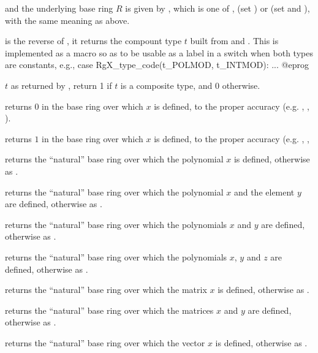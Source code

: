 and the underlying base ring $R$ is given by , which
is one of ,  (set ) or 
(set  and ), with the same meaning
as above.

 is the reverse of
, it returns the compount type $t$ built from
 and . This is implemented as a macro so as to be usable
as a label in a switch when both types are constants, e.g.,
\bprog
  case RgX_type_code(t_POLMOD, t_INTMOD): ...
@eprog

 $t$ as returned by ,
return 1 if $t$ is a composite type, and 0 otherwise.

 returns $0$ in the base ring over which $x$
is defined, to the proper accuracy (e.g. , ,
).

 returns $1$ in the base ring over which $x$
is defined, to the proper accuracy (e.g. , ,

 returns
the ``natural'' base ring over which the polynomial $x$ is defined,
otherwise as .

returns the ``natural'' base ring over which the polynomial $x$ and the element
$y$ are defined, otherwise as .

 returns
the ``natural'' base ring over which the polynomials $x$ and $y$ are defined,
otherwise as .

returns the ``natural'' base ring over which the polynomials $x$, $y$ and $z$
are defined, otherwise as .

 returns
the ``natural'' base ring over which the matrix $x$ is defined,
otherwise as .

 returns
the ``natural'' base ring over which the matrices $x$ and $y$ are defined,
otherwise as .

 returns
the ``natural'' base ring over which the vector $x$ is defined,
otherwise as .

